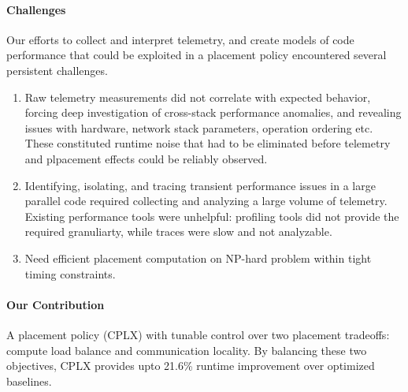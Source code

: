 \paragraph{Challenges}
Our efforts to collect and interpret telemetry, and create models of code performance that could be
exploited in a placement policy encountered several persistent challenges.

\begin{enumerate}
  \item Raw telemetry measurements did not correlate with expected behavior, forcing deep investigation of
        cross-stack performance anomalies, and revealing issues with hardware, network stack parameters, operation
        ordering etc.
        These constituted runtime noise that had to be eliminated before telemetry and plpacement effects
        could be reliably observed.
  \item Identifying, isolating, and tracing transient performance issues in a large parallel code required
        collecting and analyzing a large volume of telemetry.
        Existing performance tools were unhelpful: profiling tools did not provide the required
        granuliarty, while traces were slow and not analyzable.
  \item Need efficient placement computation on NP-hard problem within tight timing constraints.
\end{enumerate}

\paragraph{Our Contribution}
A placement policy (CPLX) with tunable control over two placement tradeoffs: compute load balance
and communication locality.
By balancing these two objectives, CPLX provides upto 21.6\% runtime improvement over optimized
baselines.


